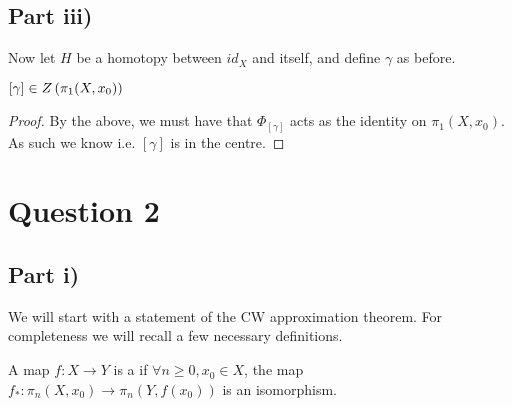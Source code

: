 \documentclass{article}
\begin{document}
\subsection{Part iii)}
Now let $H$ be a homotopy between $id_X$ and itself, and define $\gamma$ as before. 
\begin{lemma}
$[\gamma] \in Z\left( \pi_1(X,x_0) \right)$
\end{lemma}
\begin{proof}
By the above, we must have that $\Phi_{[\gamma]}$ acts as the identity on $\pi_1(X,x_0)$. As such we know 
i.e. $[\gamma]$ is in the centre. 
\end{proof}

\section{Question 2}
\subsection{Part i)}
We will start with a statement of the CW approximation theorem. For completeness we will recall a few necessary definitions.

\begin{definition}
A map $f : X \to Y$ is a  if $\forall n \geq 0, x_0 \in X$, the map $f_\ast : \pi_n(X,x_0) \to \pi_n(Y,f(x_0))$ is an isomorphism.
\end{definition}
\end{document}
